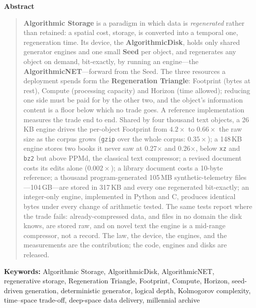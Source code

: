 \documentclass[11pt,a4paper]{article}
\theoremstyle{definition}
\theoremstyle{plain}
\theoremstyle{remark}
\newcommand{\ANET}{\textbf{AlgorithmicNET}}
\newcommand{\ADISK}{\textbf{AlgorithmicDisk}}
\newcommand{\ASTOR}{\textbf{Algorithmic Storage}}
\begin{document}
\begin{center}\textbf{Abstract}\end{center}
\begin{quote}\small
\ASTOR{} is a paradigm in which data is \emph{regenerated} rather than retained: a spatial
cost, storage, is converted into a temporal one, regeneration time. Its device, the \ADISK{},
holds only shared generator engines and one small \textbf{Seed} per object, and regenerates
any object on demand, bit-exactly, by running an engine---the \ANET{}---forward from the Seed.
The three resources a deployment spends form the \textbf{Regeneration Triangle}: Footprint
(bytes at rest), Compute (processing capacity) and Horizon (time allowed); reducing one side
must be paid for by the other two, and the object's information content is a floor below which
no trade goes. A reference implementation measures the trade end to end. Shared by four thousand text objects, a 26\,KB engine drives the per-object Footprint from
$4.2\times$ to $0.66\times$ the raw size as the corpus grows (\texttt{gzip} over the whole corpus:
$0.35\times$); a 148\,KB engine stores two books it never saw at 0.27$\times$ and 0.26$\times$,
below \texttt{xz} and \texttt{bz2} but above PPMd, the classical text compressor; a revised
document costs its edits alone ($0.002\times$); a library document costs a 10-byte reference; a
thousand program-generated 105\,MB synthetic-telemetry files---104\,GB---are stored in 317\,KB
and every one regenerated bit-exactly; an integer-only engine, implemented in Python and C,
produces identical bytes under every change of arithmetic tested. The same tests report where
the trade fails: already-compressed data, and files in no domain the disk knows, are stored raw,
and on novel text the engine is a mid-range compressor, not a record.
The law, the device, the engines, and the measurements are the contribution; the code, engines
and disks are released.
\end{quote}
\noindent\small\textbf{Keywords:} Algorithmic Storage, AlgorithmicDisk, AlgorithmicNET, regenerative storage,
Regeneration Triangle, Footprint, Compute, Horizon, seed-driven generation, deterministic generator, logical depth,
Kolmogorov complexity, time--space trade-off, deep-space data delivery, millennial archive
\normalsize
\end{document}
